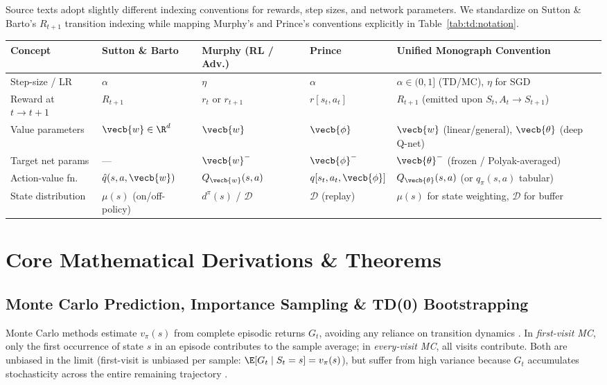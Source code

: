 \documentclass[../../../../master.tex]{subfiles}
\begin{document}
\begin{crossbook}
Source texts adopt slightly different indexing conventions for rewards, step sizes, and network parameters. We standardize on Sutton \& Barto's $R_{t+1}$ transition indexing while mapping Murphy's and Prince's conventions explicitly in Table~\ref{tab:td:notation}.
\vspace{0.4em}
\begin{center}
\small
\begin{tabularx}{\textwidth}{@{}l l l l X@{}}
\toprule
\textbf{Concept} & \textbf{Sutton \& Barto} & \textbf{Murphy (RL / Adv.)} & \textbf{Prince} & \textbf{Unified Monograph Convention} \\
\midrule
Step-size / LR & $\alpha$ & $\eta$ & $\alpha$ & $\alpha \in (0, 1]$ (TD/MC), $\eta$ for SGD \\
Reward at $t \to t+1$ & $R_{t+1}$ & $r_t$ or $r_{t+1}$ & $r[s_t, a_t]$ & $R_{t+1}$ (emitted upon $S_t, A_t \to S_{t+1}$) \\
Value parameters & $\vecb{w} \in \R^d$ & $\vecb{w}$ & $\vecb{\phi}$ & $\vecb{w}$ (linear/general), $\vecb{\theta}$ (deep Q-net) \\
Target net params & --- & $\vecb{w}^-$ & $\vecb{\phi}^-$ & $\vecb{\theta}^-$ (frozen / Polyak-averaged) \\
Action-value fn. & $\hat{q}(s, a, \vecb{w})$ & $Q_{\vecb{w}}(s, a)$ & $q[s_t, a_t, \vecb{\phi}]$ & $Q_{\vecb{\theta}}(s, a)$ (or $q_\pi(s, a)$ tabular) \\
State distribution & $\mu(s)$ (on/off-policy) & $d^\pi(s)$ / $\mathcal{D}$ & $\mathcal{D}$ (replay) & $\mu(s)$ for state weighting, $\mathcal{D}$ for buffer \\
\bottomrule
\end{tabularx}
\end{center}
\label{tab:td:notation}
\end{crossbook}

\section{Core Mathematical Derivations \& Theorems}
\label{sec:td:derivations}

\subsection{Monte Carlo Prediction, Importance Sampling \& TD(0) Bootstrapping}

Monte Carlo methods estimate $v_\pi(s)$ from complete episodic returns $G_t$, avoiding any reliance on transition dynamics . In \emph{first-visit MC}, only the first occurrence of state $s$ in an episode contributes to the sample average; in \emph{every-visit MC}, all visits contribute. Both are unbiased in the limit (first-visit is unbiased per sample: $\E[G_t \mid S_t = s] = v_\pi(s)$), but suffer from high variance because $G_t$ accumulates stochasticity across the entire remaining trajectory .
\end{document}
